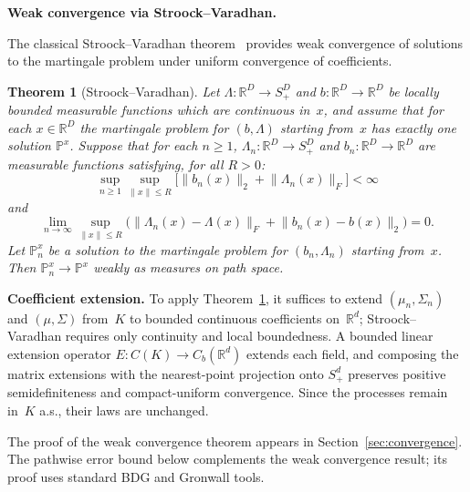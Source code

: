 \documentclass[11pt]{article}
\newcommand{\Prob}{\mathbb{P}}
\newcommand{\Rd}{\mathbb{R}^d}
\newcommand{\RD}{\mathbb{R}^D}
\newcommand{\norm}[1]{\lVert#1\rVert}
\newtheorem{thm}{Theorem}[section]
\begin{document}
\noindent \textbf{Weak convergence via Stroock--Varadhan.}
\label{ssec:weak-convergence}

The classical Stroock--Varadhan theorem~\cite{stroock1979multidimensional} provides weak convergence of
solutions to the martingale problem under uniform convergence of
coefficients.

\begin{thm}[Stroock--Varadhan]\label{thm:stroock-varadhan}
Let $\Lambda:\RD\to S_+^D$ and $b:\RD\to\RD$ be locally bounded
measurable functions which are continuous in~$x$, and assume that for
each $x\in\RD$ the martingale problem for $(b,\Lambda)$ starting
from~$x$ has exactly one solution $\Prob^x$.  Suppose that for each
$n\ge 1$, $\Lambda_n:\RD\to S_+^D$ and $b_n:\RD\to\RD$ are
measurable functions satisfying, for all $R>0$:
\[
  \sup_{n\ge 1}\sup_{\norm{x}\le R}
  \big[\norm{b_n(x)}_2+\norm{\Lambda_n(x)}_F\big]<\infty
\]
and
\[
  \lim_{n\to\infty}\sup_{\norm{x}\le R}
  \big(\norm{\Lambda_n(x)-\Lambda(x)}_F
      +\norm{b_n(x)-b(x)}_2\big) = 0.
\]
Let $\Prob_n^x$ be a solution to the martingale problem for
$(b_n,\Lambda_n)$ starting from~$x$.  Then
$\Prob_n^x\to\Prob^x$ weakly as measures on path space.
\end{thm}

\noindent\textbf{Coefficient extension.}
To apply Theorem~\ref{thm:stroock-varadhan}, it suffices to
extend $(\mu_n,\Sigma_n)$ and $(\mu,\Sigma)$ from~$K$ to
bounded continuous coefficients on~$\Rd$; Stroock--Varadhan
requires only continuity and local boundedness.
A bounded linear extension operator
$E\!:C(K)\to C_b(\Rd)$ extends each field, and
composing the matrix extensions with the nearest-point
projection onto $S_+^d$ preserves positive
semidefiniteness and compact-uniform convergence.
Since the processes remain in~$K$ a.s., their laws are
unchanged.

The proof of the weak convergence theorem appears in
Section~\ref{sec:convergence}.
The pathwise error bound below complements the weak convergence
result; its proof uses standard BDG and Gronwall tools.
\end{document}
